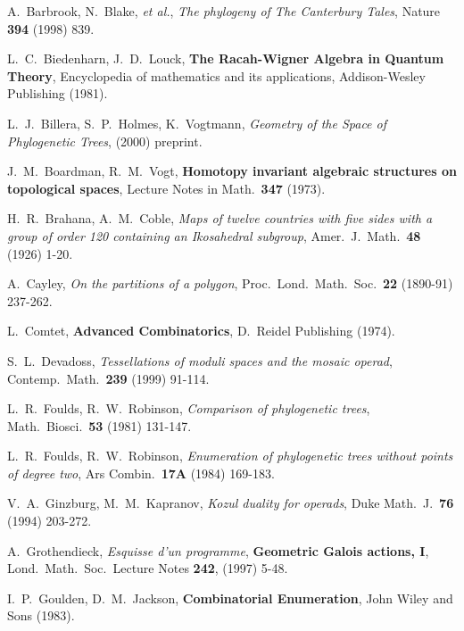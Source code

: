 \documentclass[10pt]{amsart}
\begin{document}
    
    \begin{thebibliography}{ADM9}
    \baselineskip=12pt
    
     A.\ Barbrook, N.\ Blake, {\em et al.}, {\em The phylogeny of The Canterbury Tales}, Nature {\bf 394} (1998) 839.
    
     L.\ C.\ Biedenharn, J.\ D.\ Louck, {\bf The Racah-Wigner Algebra in Quantum Theory}, Encyclopedia of mathematics and its applications, Addison-Wesley Publishing (1981).
    
    
     L.\ J.\ Billera, S.\ P.\ Holmes, K.\ Vogtmann, {\em Geometry of the Space of Phylogenetic Trees}, (2000) preprint.
    
     J.\ M.\ Boardman, R.\ M.\ Vogt, {\bf Homotopy invariant algebraic structures on topological spaces}, Lecture Notes in Math.\ {\bf 347} (1973).
    
    
     H.\ R.\ Brahana, A.\ M.\ Coble, {\em Maps of twelve countries with five sides with a group of order 120 containing an Ikosahedral subgroup}, Amer.\ J.\ Math.\ {\bf 48} (1926) 1-20.
    
     A.\ Cayley, {\em On the partitions of a polygon}, Proc.\ Lond.\ Math.\ Soc.\ {\bf 22} (1890-91) 237-262.
    
     L.\ Comtet, {\bf Advanced Combinatorics}, D.\ Reidel Publishing (1974).
    
     S.\ L.\ Devadoss, {\em Tessellations of moduli spaces and the mosaic operad},  Contemp.\ Math.\ {\bf 239} (1999) 91-114.
    
     L.\ R.\ Foulds, R.\ W.\ Robinson, {\em Comparison of phylogenetic trees},  Math.\ Biosci.\ {\bf 53} (1981) 131-147.
    
     L.\ R.\ Foulds, R.\ W.\ Robinson, {\em Enumeration of phylogenetic trees without points of degree two},  Ars Combin.\ {\bf 17A} (1984) 169-183.
    
     V.\ A.\ Ginzburg, M.\ M.\ Kapranov, {\em Kozul duality for operads},  Duke Math.\ J.\ {\bf 76} (1994) 203-272.
    
     A.\ Grothendieck, {\em Esquisse d'un programme}, {\bf Geometric Galois actions, I}, Lond.\ Math.\ Soc.\ Lecture Notes {\bf 242}, (1997) 5-48.
    
     I.\ P.\ Goulden, D.\ M.\ Jackson, {\bf Combinatorial Enumeration}, John Wiley and Sons (1983).
    

\end{thebibliography}
\end{document}
